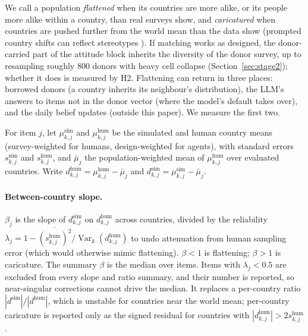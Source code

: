 \documentclass[10pt]{article}
\begin{document}
We call a population \emph{flattened} when its countries are more alike, or its people more alike within a country, than real surveys show, and \emph{caricatured} when countries are pushed further from the world mean than the data show (prompted country shifts can reflect stereotypes \citep{durmus2023}). If matching works as designed, the donor-carried part of the attitude block inherits the diversity of the donor survey, up to resampling roughly 800 donors with heavy cell collapse (Section~\ref{sec:stage2}); whether it does is measured by H2. Flattening can return in three places: borrowed donors (a country inherits its neighbour's distribution), the LLM's answers to items not in the donor vector (where the model's default takes over), and the daily belief updates (outside this paper). We measure the first two.

For item $j$, let $\mu^{\text{sim}}_{k,j}$ and $\mu^{\text{hum}}_{k,j}$ be the simulated and human country means (survey-weighted for humans, design-weighted for agents), with standard errors $s^{\text{sim}}_{k,j}$ and $s^{\text{hum}}_{k,j}$, and $\bar\mu_j$ the population-weighted mean of $\mu^{\text{hum}}_{k,j}$ over evaluated countries. Write $d^{\text{hum}}_{k,j} = \mu^{\text{hum}}_{k,j} - \bar\mu_j$ and $d^{\text{sim}}_{k,j} = \mu^{\text{sim}}_{k,j} - \bar\mu_j$.

\paragraph{Between-country slope.} $\beta_j$ is the slope of $d^{\text{sim}}_{k,j}$ on $d^{\text{hum}}_{k,j}$ across countries, divided by the reliability $\lambda_j = 1 - \overline{(s^{\text{hum}}_{k,j})^2}/\operatorname{Var}_k(d^{\text{hum}}_{k,j})$ to undo attenuation from human sampling error (which would otherwise mimic flattening). $\beta<1$ is flattening; $\beta>1$ is caricature. The summary $\beta$ is the median over items. Items with $\lambda_j < 0.5$ are excluded from every slope and ratio summary, and their number is reported, so near-singular corrections cannot drive the median. It replaces a per-country ratio $|d^{\text{sim}}|/|d^{\text{hum}}|$, which is unstable for countries near the world mean; per-country caricature is reported only as the signed residual for countries with $|d^{\text{hum}}_{k,j}| > 2 s^{\text{hum}}_{k,j}$.
\end{document}
